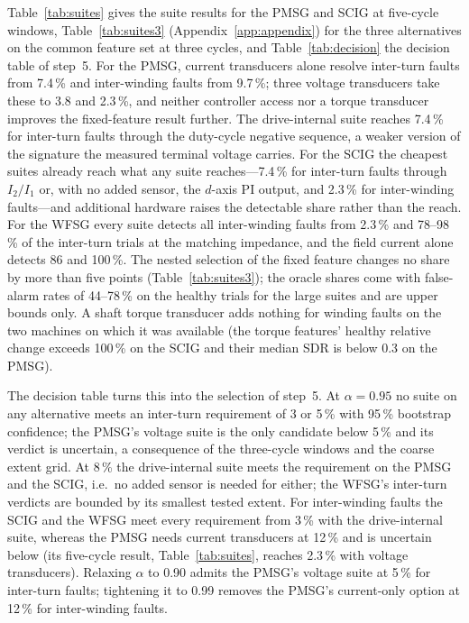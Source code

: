Table~\ref{tab:suites} gives the suite results for the PMSG and SCIG at five-cycle windows, Table~\ref{tab:suites3} (Appendix~\ref{app:appendix}) for the three alternatives on the common feature set at three cycles, and Table~\ref{tab:decision} the decision table of step~5. For the PMSG, current transducers alone resolve inter-turn faults from 7.4\,\% and inter-winding faults from 9.7\,\%; three voltage transducers take these to 3.8 and 2.3\,\%, and neither controller access nor a torque transducer improves the fixed-feature result further. The drive-internal suite reaches 7.4\,\% for inter-turn faults through the duty-cycle negative sequence, a weaker version of the signature the measured terminal voltage carries. For the SCIG the cheapest suites already reach what any suite reaches---7.4\,\% for inter-turn faults through $I_2/I_1$ or, with no added sensor, the $d$-axis PI output, and 2.3\,\% for inter-winding faults---and additional hardware raises the detectable share rather than the reach. For the WFSG every suite detects all inter-winding faults from 2.3\,\% and 78--98\,\% of the inter-turn trials at the matching impedance, and the field current alone detects 86 and 100\,\%. The nested selection of the fixed feature changes no share by more than five points (Table~\ref{tab:suites3}); the oracle shares come with false-alarm rates of 44--78\,\% on the healthy trials for the large suites and are upper bounds only. A shaft torque transducer adds nothing for winding faults on the two machines on which it was available (the torque features' healthy relative change exceeds 100\,\% on the SCIG and their median SDR is below 0.3 on the PMSG).



The decision table turns this into the selection of step~5. At $\alpha=0.95$ no suite on any alternative meets an inter-turn requirement of 3 or 5\,\% with 95\,\% bootstrap confidence; the PMSG's voltage suite is the only candidate below 5\,\% and its verdict is uncertain, a consequence of the three-cycle windows and the coarse extent grid. At 8\,\% the drive-internal suite meets the requirement on the PMSG and the SCIG, i.e.\ no added sensor is needed for either; the WFSG's inter-turn verdicts are bounded by its smallest tested extent. For inter-winding faults the SCIG and the WFSG meet every requirement from 3\,\% with the drive-internal suite, whereas the PMSG needs current transducers at 12\,\% and is uncertain below (its five-cycle result, Table~\ref{tab:suites}, reaches 2.3\,\% with voltage transducers). Relaxing $\alpha$ to 0.90 admits the PMSG's voltage suite at 5\,\% for inter-turn faults; tightening it to 0.99 removes the PMSG's current-only option at 12\,\% for inter-winding faults.

